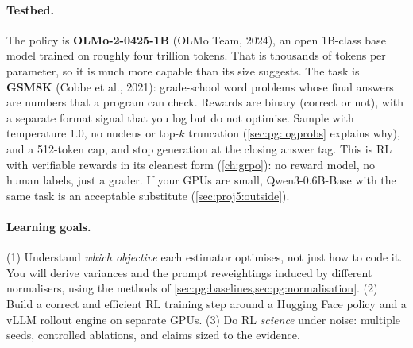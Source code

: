 \paragraph{Testbed.} The policy is \textbf{OLMo-2-0425-1B} (OLMo Team, 2024), an open 1B-class base
model trained on roughly four trillion tokens. That is thousands of tokens per parameter, so it is
much more capable than its size suggests. The task is \textbf{GSM8K} (Cobbe et al., 2021): grade-school
word problems whose final answers are numbers that a program can check. Rewards are binary
(correct or not), with a separate format signal that you log but do not optimise. Sample with
temperature 1.0, no nucleus or top-$k$ truncation (\cref{sec:pg:logprobs} explains why), and a
512-token cap, and stop generation at the closing answer tag. This is RL with verifiable rewards in
its cleanest form (\cref{ch:grpo}): no reward model, no human labels, just a grader. If your GPUs are
small, Qwen3-0.6B-Base with the same task is an acceptable substitute (\cref{sec:proj5:outside}).

\paragraph{Learning goals.} (1) Understand \emph{which objective} each estimator optimises, not just
how to code it. You will derive variances and the prompt reweightings induced by different
normalisers, using the methods of \cref{sec:pg:baselines,sec:pg:normalisation}. (2) Build a correct
and efficient RL training step around a Hugging Face policy and a vLLM rollout engine on separate
GPUs. (3) Do RL \emph{science} under noise: multiple seeds, controlled ablations, and claims sized
to the evidence.

